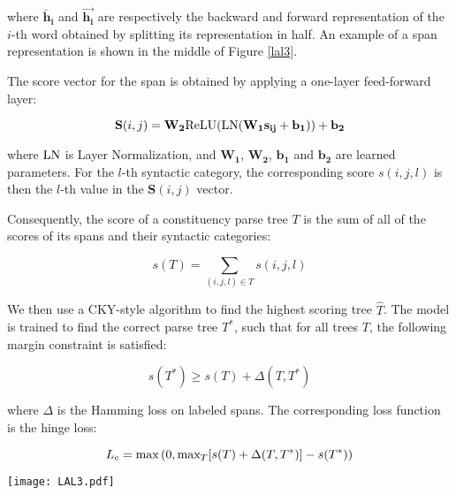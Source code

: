 \documentclass[11pt,a4paper]{article}
\begin{document}
\noindent where $\overleftarrow{\mathbf{h_i}}$ and $\overrightarrow{\mathbf{h_i}}$ are respectively the backward and forward representation of the $i$-th word obtained by splitting its representation in half. An example of a span representation is shown in the middle of Figure \ref{lal3}.

The score vector for the span is obtained by applying a one-layer feed-forward layer:

\begin{equation}
    \mathbf{S}(i,j) = \mathbf{W_2} \textup{ReLU} 
    ( \textup{LN} 
    ( \mathbf{W_1} \mathbf{s_{ij}}
    + \mathbf{b_1} ) ) 
    + \mathbf{b_2}
\end{equation}

\noindent where $\textup{LN}$ is Layer Normalization, and $\mathbf{W_1}$, $\mathbf{W_2}$, $\mathbf{b_1}$ and $\mathbf{b_2}$ are learned parameters. For the $l$-th syntactic category, the corresponding score $s(i,j,l)$ is then the $l$-th value in the $\mathbf{S}(i,j)$ vector.

Consequently, the score of a constituency parse tree $T$ is the sum of all of the scores of its spans and their syntactic categories:

\begin{equation}
    s(T) = \sum_{(i,j,l) \in T} s(i,j,l)
\end{equation}

We then use a CKY-style algorithm \cite{stern2017minimal, gaddy2018s} to find the highest scoring tree $\hat{T}$. The model is trained to find the correct parse tree $T^{*}$, such that for all trees $T$, the following margin constraint is satisfied:

\begin{equation}
    s(T^{*}) \geq s(T) + \Delta (T, T^{*})
\end{equation}

\noindent where $\Delta$ is the Hamming loss on labeled spans. The corresponding loss function is the hinge loss:

\begin{equation}
    L_{c} = \textup{max}\left(0, \textup{max}_{T}[s(T) + \Delta (T, T^{*})] - s(T^{*})\right)
\end{equation}

\begin{figure*}
    \centering
    \texttt{[image: LAL3.pdf]}
    \caption{If we remove the position-wise feed-forward layer, we can compute the contributions from each label attention head to the span representation, and thus interpret head contributions. This illustrative example follows the label color scheme in Figure \ref{lal6}.}
    \label{lal3}
\end{figure*}
\end{document}
